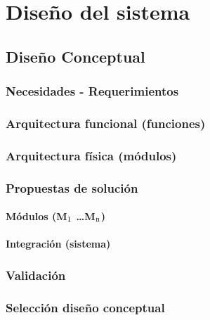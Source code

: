 \chapter{Diseño del sistema}
%
\section{Diseño Conceptual}
%
\subsection{Necesidades - Requerimientos}
%
\subsection{Arquitectura funcional (funciones)}

\subsection{Arquitectura física (módulos)}

\subsection{Propuestas de solución}

\subsubsection{Módulos (M$\textsubscript{1}$  \dots M$\textsubscript{n}$)}

\subsubsection{Integración (sistema)}


\subsection{Validación}

\subsection{Selección diseño conceptual}



\endinput